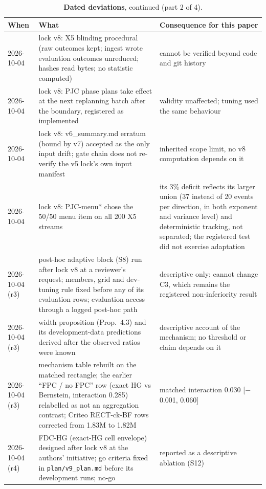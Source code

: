 \documentclass[sigconf,anonymous,review]{acmart}
\begin{document}
\begin{table}[p]
\addtocounter{table}{-1}
\caption{\textbf{Dated deviations}, continued (part 2 of 4).}
\small
\begin{tabular}{@{}l>{\raggedright\arraybackslash}p{6.6cm}>{\raggedright\arraybackslash}p{7.6cm}@{}}
\toprule
When & What & Consequence for this paper \\
\midrule
2026-10-04 & lock v8: X5 blinding procedural (raw outcomes kept; ingest wrote evaluation outcomes unreduced; hashes read bytes; no statistic computed) & cannot be verified beyond code and git history \\
2026-10-04 & lock v8: PJC phase plans take effect at the next replanning batch after the boundary, registered as implemented & validity unaffected; tuning used the same behaviour \\
2026-10-04 & lock v8: v6\_summary.md erratum (bound by v7) accepted as the only input drift; gate chain does not re-verify the v5 lock's own input manifest & inherited scope limit, no v8 computation depends on it \\
2026-10-04 & lock v8: PJC-menu* chose the 50/50 menu item on all 200 X5 streams & its 3\% deficit reflects its larger union (37 instead of 20 events per direction, in both exponent and variance level) and deterministic tracking, not separated; the registered test did not exercise adaptation \\
2026-10-04 (r3) & post-hoc adaptive block (S8) run after lock v8 at a reviewer's request; members, grid and dev-tuning rule fixed before any of its evaluation rows; evaluation access through a logged post-hoc path & descriptive only; cannot change C3, which remains the registered non-inferiority result \\
2026-10-04 (r3) & width proposition (Prop.~4.3) and its development-data predictions derived after the observed ratios were known & descriptive account of the mechanism; no threshold or claim depends on it \\
2026-10-04 (r3) & mechanism table rebuilt on the matched rectangle; the earlier ``FPC / no FPC'' row (exact HG vs Bernstein, interaction 0.285) relabelled as not an aggregation contrast; Criteo RECT-ck-BF rows corrected from 1.83M to 1.82M & matched interaction 0.030 [$-$0.001, 0.060] \\
2026-10-04 (r4) & FDC-HG (exact-HG cell envelope) designed after lock v8 at the authors' initiative; go criteria fixed in \texttt{plan/v9\_plan.md} before its development runs; no-go & reported as a descriptive ablation (S12) \\

\end{tabular}
\end{table}
\end{document}
